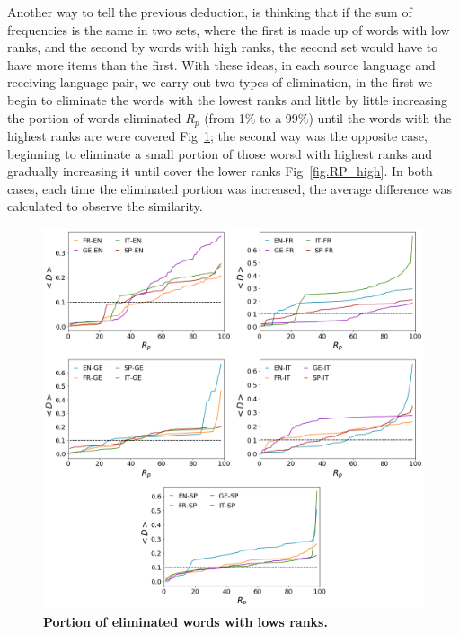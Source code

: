 \documentclass[10pt,letterpaper]{article} %
\begin{document}
	
	Another way to tell the previous deduction, is thinking that if the sum of frequencies is the same in two sets, where the first is made up of words with low ranks, and the second by words with high ranks, the second set would have to have more items than the first. With these ideas, in each source language and receiving language pair, we carry out two types of elimination, in the first we begin to eliminate the words with the lowest ranks and little by little increasing the portion of words eliminated $R_{p}$ (from 1$\%$ to a 99$\%$) until the words with the highest ranks are
	were covered Fig~\ref{fig.RP_low}; the second way was the opposite case, beginning to eliminate a small portion of those worsd with highest ranks and gradually increasing it until cover the lower ranks Fig~\ref{fig.RP_high}. In both cases, each time the eliminated portion was increased, the average difference was calculated to observe the similarity.
	
	
	\begin{figure}[!h]
		\begin{adjustwidth}{-2.5cm}{1cm}
			\centering
			\includegraphics[scale=.38]{Rp_bajos.png}
			\caption{{\bf Portion of eliminated words with lows ranks.} }
			\label{fig.RP_low}
		\end{adjustwidth}
	\end{figure}
	
\end{document}
